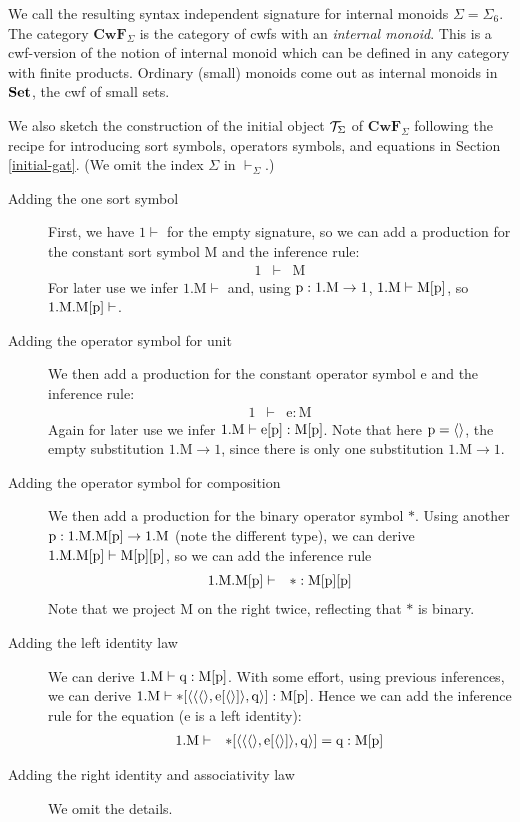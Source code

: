 \documentclass{lmcs}
\def\Cwf{\mathbf{CwF}}
\def\Mon{\mathrm{M}}
\def\idmon{\mathrm{e}}
\def\comp{\mathrm{*}}
\begin{document}
We call the resulting syntax independent signature for internal monoids $\Sigma = \Sigma_6$. The category $\Cwf_\Sigma$ is the category of cwfs with an {\em internal monoid}. This is a cwf-version of the notion of internal monoid which can be defined in any category with finite products. Ordinary (small) monoids come out as internal monoids in ${\bf Set}$, the cwf of small sets.

We also sketch the construction of the initial object ${\mathcal T}_\Sigma$ of $\Cwf_\Sigma$ following the recipe for introducing sort symbols, operators symbols, and equations in Section \ref{initial-gat}. (We omit the index $\Sigma$ in $\vdash_\Sigma$.)
\begin{description}
\item[Adding the one sort symbol]
First, we have $1 \vdash$ for the empty signature, so we can
add a production for the constant sort symbol $\Mon$ and the inference rule:
\begin{eqnarray*}
1 &\vdash& \Mon
\end{eqnarray*}
For later use we infer $1.\Mon \vdash$ and, using $\p:1.\Mon \to 1$, $1.\Mon\vdash\Mon[\p]$,
so $1.\Mon.\Mon[\p] \vdash$.
\item[Adding the operator symbol for unit]
We then add a production for the constant operator symbol $\idmon$ and the inference rule:
\begin{eqnarray*}
1 &\vdash& \idmon : \Mon
\end{eqnarray*}
Again for later use we infer $1.\Mon\vdash \idmon[\p] :\Mon[\p]$.
Note that here $\mathrm{p} = \langle  \rangle$, the empty substitution $1.\Mon \to 1$,
since there is only one substitution $1.\Mon \to 1$.
\item[Adding the operator symbol for composition]
We then add a production for the binary operator symbol $\comp$.
Using another $\p: 1.\Mon.\Mon[\p] \to 1.\Mon$ (note the different type),
we can derive $1.\Mon.\Mon[\p] \vdash \Mon[\p][\p]$, so we can add the inference rule
\begin{eqnarray*}
1.\Mon.\Mon[\p] &\vdash& \comp : \Mon[\p][\p]
\end{eqnarray*}
Note that we project $\Mon$ on the right twice, reflecting that $\comp$ is binary.
\item[Adding the left identity law]
We can derive $1.\Mon \vdash \q : \Mon[\p]$. With some effort,
using previous inferences, we can  derive
$1.\Mon \vdash \comp[\tuple{\tuple{\tuple{},\idmon[\tuple{}]},\q}] : \Mon[\p]$.
Hence we can add the inference rule for the equation ($\idmon$ is a left identity):
\begin{eqnarray*}
1.\Mon &\vdash& \comp[\tuple{\tuple{\tuple{},\idmon[\tuple{}]},\q}] = \q : \Mon[\p]
\end{eqnarray*}
\item[Adding the right identity and associativity law]
We omit the details.
\end{description}
\end{document}

